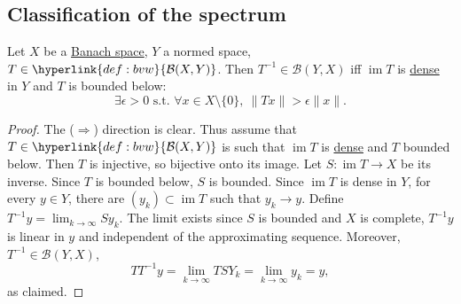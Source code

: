 \documentclass{article}
\DeclareMathOperator{\im}{im}
\begin{document}
\subsection{Classification of the spectrum}
\begin{prop}
    Let $X$ be a \hyperlink{def:banach}{Banach space}, $Y$ a normed space, $T \in \hyperlink{def:bvw}{\mathcal{B}(X,Y)}$.
    Then $T^{-1} \in \mathcal{B}(Y,X)$ iff $\im T$ is \hyperlink{def:dense}{dense} in $Y$ and $T$ is bounded below:
    \begin{equation*}
        \exists \epsilon > 0 \text{ s.t. } \forall x \in X \setminus \{0\}, \ \|T x\| > \epsilon \|x\|.
    \end{equation*}
\end{prop}

\begin{proof}
    The ($\Rightarrow$) direction is clear.
    Thus assume that $T \in \hyperlink{def:bvw}{\mathcal{B}(X, Y)}$ is such that $\im T$ is \hyperlink{def:dense}{dense} and $T$ bounded below.
    Then $T$ is injective, so bijective onto its image.
    Let $S: \im T \to X$ be its inverse.
    Since $T$ is bounded below, $S$ is bounded.
    Since $\im T$ is dense in $Y$, for every $y \in Y$, there are $(y_k) \subset \im T$ such that $y_k \to y$.
    Define $T^{-1} y = \lim_{k \to \infty} Sy_k$.
    The limit exists since $S$ is bounded and $X$ is complete, $T^{-1} y$ is linear in $y$ and independent of the approximating sequence.
    Moreover, $T^{-1} \in \mathcal{B}(Y, X)$,
    \begin{equation*}
        T T^{-1} y = \lim_{k \to \infty} T S Y_k = \lim_{k \to \infty} y_k = y,
    \end{equation*}
    as claimed.
\end{proof}

\end{document}
